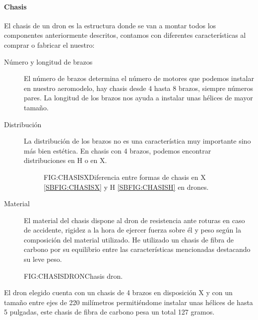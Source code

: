 
\paragraph{Chasis}
\label{SSS:Chasis}

	El chasis de un dron es la estructura donde se van a montar todos los componentes anteriormente descritos, contamos con diferentes características al comprar o fabricar el nuestro:
	
	\begin{description}
	\item[Número y longitud de brazos] El número de brazos determina el número de motores que podemos instalar en nuestro aeromodelo, hay chasis desde 4 hasta 8 brazos, siempre números pares.
	La longitud de los brazos nos ayuda a instalar unas hélices de mayor tamaño.
	\item[Distribución] La distribución de los brazos no es una característica muy importante sino más bien estética. En chasis con 4 brazos, podemos encontrar distribuciones en H o en X.
	\begin{figure}[Chasis dron en X y H]{FIG:CHASISX}{Diferencia entre formas de chasis en X \ref{SBFIG:CHASISX} y H \ref{SBFIG:CHASISH} en drones.}
	
   \quad
  
\end{figure} 
	\item[Material]
	El material del chasis dispone al dron de resistencia ante roturas en caso de accidente, rigidez a la hora de ejercer fuerza sobre él y peso según la composición del material utilizado.
	He utilizado un chasis de fibra de carbono por su equilibrio entre las características mencionadas destacando su leve peso.
	\end{description}
	
	\begin{figure}[Chasis dron]{FIG:CHASISDRON}{Chasis dron.}
\end{figure}	
		
	El dron elegido cuenta con un chasis de 4 brazos en disposición X y con un tamaño entre ejes de 220 milímetros permitiéndome instalar unas hélices de hasta 5 pulgadas, este chasis de fibra de carbono pesa un total 127 gramos.
		

